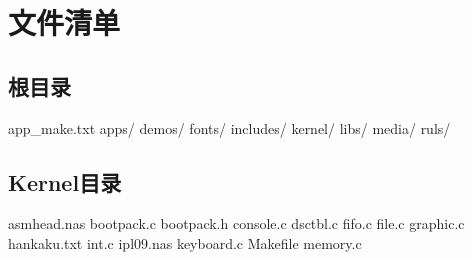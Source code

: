 \chapter{文件清单}

\section{根目录}
app\_make.txt
apps/
demos/
fonts/
includes/
kernel/
libs/
media/
ruls/
\section{Kernel目录}
asmhead.nas                                                                                                                                        
bootpack.c                                                                                                                                         
bootpack.h                                                                                                                                           
console.c                                                                                                                                          
dsctbl.c                                                                                                                                           
fifo.c                                                                                                                                             
file.c                                                                                                                                             
graphic.c                                                                                                                                          
hankaku.txt                                                                                                                                        
int.c                                                                                                                                              
ipl09.nas                                                                                                                                          
keyboard.c                                                                                                                                           
Makefile                                                                                                                                           
memory.c                                                                                                                                           
